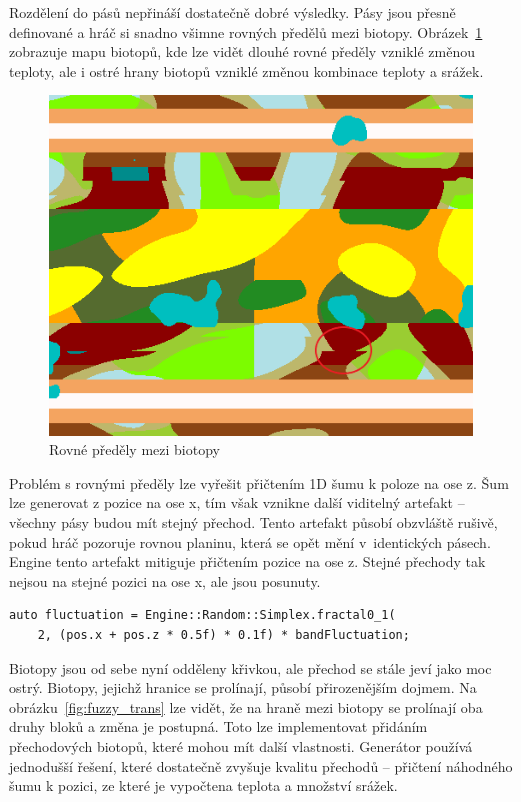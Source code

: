 \documentclass[thesis=M,czech]{FITthesis}[2019/12/23]
\begin{document}
Rozdělení do pásů nepřináší dostatečně dobré výsledky. Pásy jsou přesně definované a hráč si snadno všimne rovných předělů mezi biotopy. Obrázek~\ref{fig:biomes_old} zobrazuje mapu biotopů, kde lze vidět dlouhé rovné předěly vzniklé změnou teploty, ale i ostré hrany biotopů vzniklé změnou kombinace teploty a srážek.

\begin{figure}\centering
	\includegraphics[width=\textwidth]{images/world_gen/biomes_old}
	\caption[Rovné předěly mezi biotopy]{Rovné předěly mezi biotopy}\label{fig:biomes_old}
\end{figure}

Problém s rovnými předěly lze vyřešit přičtením 1D šumu k poloze na ose z. Šum lze generovat z pozice na ose x, tím však vznikne další viditelný artefakt – všechny pásy budou mít stejný přechod. Tento artefakt působí obzvláště rušivě, pokud hráč pozoruje rovnou planinu, která se opět mění v~identických pásech. Engine tento artefakt mitiguje přičtením pozice na ose z. Stejné přechody tak nejsou na stejné pozici na ose x, ale jsou posunuty.

\begin{verbatim}
auto fluctuation = Engine::Random::Simplex.fractal0_1(
    2, (pos.x + pos.z * 0.5f) * 0.1f) * bandFluctuation;
\end{verbatim}

Biotopy jsou od sebe nyní odděleny křivkou, ale přechod se stále jeví jako moc ostrý. Biotopy, jejichž hranice se prolínají, působí přirozenějším dojmem. Na obrázku~\ref{fig:fuzzy_trans} lze vidět, že na hraně mezi biotopy se prolínají oba druhy bloků a změna je postupná. Toto lze implementovat přidáním přechodových biotopů, které mohou mít další vlastnosti. Generátor používá jednodušší řešení, které dostatečně zvyšuje kvalitu přechodů – přičtení náhodného šumu k pozici, ze které je vypočtena teplota a množství srážek.
\end{document}

